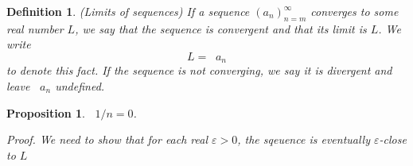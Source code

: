 \documentclass{article}
\newtheorem{definition}{Definition}[subsection]
\newtheorem{proposition}{Proposition}[subsection]
\newcommand{\vep}{\varepsilon} %
\DeclareMathOperator{\inflim}{\lim_{n \to \infty}}
\let\it\textit
\begin{document}
\begin{definition}
	(Limits of sequences) If a sequence $(a_n)_{n=m}^\infty$ converges
	to some real number $L$, we say that the sequence
	is convergent and that its limit is $L$. We write
	$$
	L = \inflim a_n
	$$
	to denote this fact. If the sequence is not converging,
	we say it is divergent and leave $\inflim a_n$ undefined.
\end{definition}

\begin{proposition}
	$\inflim 1/n = 0$. 

	\it{Proof}. We need to show that for each real 
	$\vep > 0$, the sqeuence is eventually $\vep$-close 
	to $L$
\end{proposition}
\end{document}
